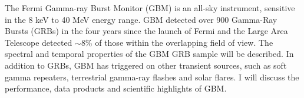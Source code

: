 


\bigskip



\bigskip

\noindent The Fermi Gamma-ray Burst Monitor (GBM) is an all-sky instrument, sensitive in the 8 keV to 40 MeV energy range. GBM  detected over 900 Gamma-Ray Bursts (GRBs) in the four years since the launch of Fermi and the Large Area Telescope detected $\sim$8\% of those within the overlapping field of view. The spectral and temporal properties of the GBM GRB sample will be described. In addition to GRBs, GBM has triggered on other transient sources, such as soft gamma repeaters, terrestrial gamma-ray flashes and solar flares. I will discuss the performance, data products and scientific highlights of GBM.

